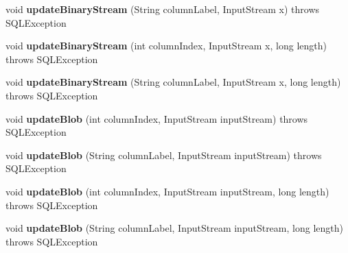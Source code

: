 \begin{DoxyCompactItemize}
void {\bfseries update\+Binary\+Stream} (String column\+Label, Input\+Stream x)  throws S\+Q\+L\+Exception 
\item 
\mbox{\label{classcom_1_1mysql_1_1cj_1_1jdbc_1_1result_1_1_result_set_impl_aef16da9a4df388c6034e76718f9b2dfa}} 
void {\bfseries update\+Binary\+Stream} (int column\+Index, Input\+Stream x, long length)  throws S\+Q\+L\+Exception 
\item 
\mbox{\label{classcom_1_1mysql_1_1cj_1_1jdbc_1_1result_1_1_result_set_impl_a35e1683c6dfda602277b4ced8562001b}} 
void {\bfseries update\+Binary\+Stream} (String column\+Label, Input\+Stream x, long length)  throws S\+Q\+L\+Exception 
\item 
\mbox{\label{classcom_1_1mysql_1_1cj_1_1jdbc_1_1result_1_1_result_set_impl_a30ad3f0b0e9d62d2052a354fd01d8e46}} 
void {\bfseries update\+Blob} (int column\+Index, Input\+Stream input\+Stream)  throws S\+Q\+L\+Exception 
\item 
\mbox{\label{classcom_1_1mysql_1_1cj_1_1jdbc_1_1result_1_1_result_set_impl_ab8ca4b5622be83e3ed39bf74d09db631}} 
void {\bfseries update\+Blob} (String column\+Label, Input\+Stream input\+Stream)  throws S\+Q\+L\+Exception 
\item 
\mbox{\label{classcom_1_1mysql_1_1cj_1_1jdbc_1_1result_1_1_result_set_impl_a609aa095e52384f6b21cfab8b8b63608}} 
void {\bfseries update\+Blob} (int column\+Index, Input\+Stream input\+Stream, long length)  throws S\+Q\+L\+Exception 
\item 
\mbox{\label{classcom_1_1mysql_1_1cj_1_1jdbc_1_1result_1_1_result_set_impl_a1b0c64af799795925fa382af77223775}} 
void {\bfseries update\+Blob} (String column\+Label, Input\+Stream input\+Stream, long length)  throws S\+Q\+L\+Exception 
\item 
\mbox{\label{classcom_1_1mysql_1_1cj_1_1jdbc_1_1result_1_1_result_set_impl_a903ab0502049e0b71367bc465ce980df}} 

\end{DoxyCompactItemize}
